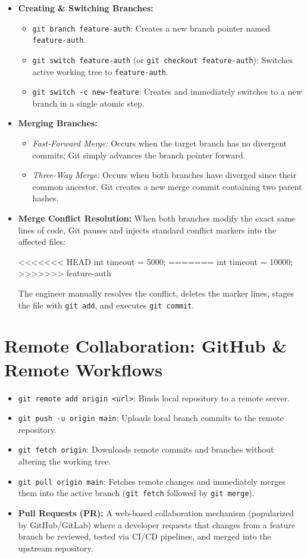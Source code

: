 \begin{itemize}[leftmargin=1.5em]
    \item \textbf{Creating \& Switching Branches:}
    \begin{itemize}
        \item \texttt{git branch feature-auth}: Creates a new branch pointer named \texttt{feature-auth}.
        \item \texttt{git switch feature-auth} (or \texttt{git checkout feature-auth}): Switches active working tree to \texttt{feature-auth}.
        \item \texttt{git switch -c new-feature}: Creates and immediately switches to a new branch in a single atomic step.
    \end{itemize}
    \item \textbf{Merging Branches:}
    \begin{itemize}
        \item \textit{Fast-Forward Merge:} Occurs when the target branch has no divergent commits; Git simply advances the branch pointer forward.
        \item \textit{Three-Way Merge:} Occurs when both branches have diverged since their common ancestor. Git creates a new merge commit containing two parent hashes.
    \end{itemize}
    \item \textbf{Merge Conflict Resolution:} When both branches modify the exact same lines of code, Git pauses and injects standard conflict markers into the affected files:
\begin{terminalbox}
<<<<<<< HEAD
int timeout = 5000;
=======
int timeout = 10000;
>>>>>>> feature-auth
\end{terminalbox}
    The engineer manually resolves the conflict, deletes the marker lines, stages the file with \texttt{git add}, and executes \texttt{git commit}.
\end{itemize}

\section{Remote Collaboration: GitHub \& Remote Workflows}
\begin{itemize}[leftmargin=1.5em]
    \item \texttt{git remote add origin <url>}: Binds local repository to a remote server.
    \item \texttt{git push -u origin main}: Uploads local branch commits to the remote repository.
    \item \texttt{git fetch origin}: Downloads remote commits and branches without altering the working tree.
    \item \texttt{git pull origin main}: Fetches remote changes and immediately merges them into the active branch (\texttt{git fetch} followed by \texttt{git merge}).
    \item \textbf{Pull Requests (PR):} A web-based collaboration mechanism (popularized by GitHub/GitLab) where a developer requests that changes from a feature branch be reviewed, tested via CI/CD pipelines, and merged into the upstream repository.
\end{itemize}

